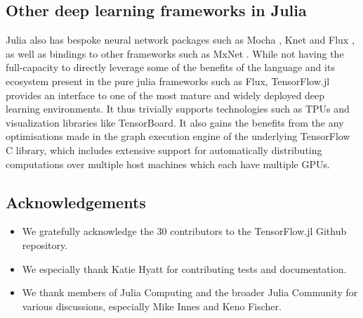 \documentclass{book}
\begin{document}
\hypertarget{other-deep-learning-frameworks-in-julia}{%
\subsection{Other deep learning frameworks in
		Julia}\label{other-deep-learning-frameworks-in-julia}}

Julia also has bespoke neural network packages such as Mocha
\citep{mocha2014}, Knet \citep{knet2016} and Flux \citep{flux}, as
well as bindings to other frameworks such as MxNet \citep{mxnet2015}.
While not having the full-capacity to directly leverage some of the
benefits of the language and its ecosystem present in the pure julia
frameworks such as Flux, TensorFlow.jl provides an interface to one of
the most mature and widely deployed deep learning environments. It thus
trivially supports technologies such as TPUs and visualization libraries
like TensorBoard. It also gains the benefits from the any optimisations
made in the graph execution engine of the underlying TensorFlow C
library, which includes extensive support for automatically
distributing computations over multiple host machines which each
have multiple GPUs.

\hypertarget{acknowledgements}{%
\subsection{Acknowledgements}\label{acknowledgements}}

\begin{itemize}
	\item
	We gratefully acknowledge the 30 contributors to the TensorFlow.jl
	Github repository.
	\item
	We especially thank Katie Hyatt for contributing tests and
	documentation.
	\item
	We thank members of Julia Computing and the broader Julia Community
	for various discussions, especially Mike Innes and Keno Fischer.
\end{itemize}
\end{document}
